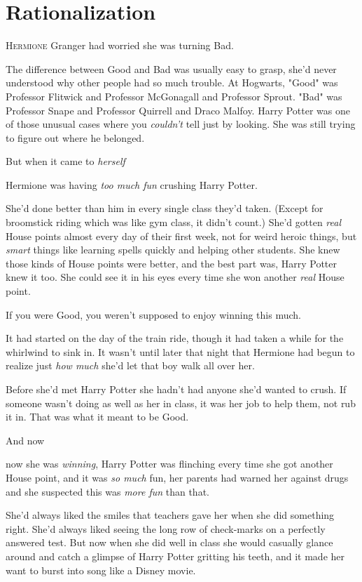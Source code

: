\chapter{Rationalization}

\lettrine{H}{ermione} Granger had worried she was turning Bad.

The difference between Good and Bad was usually easy to grasp, she'd never
understood why other people had so much trouble. At Hogwarts, "Good" was
Professor Flitwick and Professor McGonagall and Professor Sprout. "Bad" was
Professor Snape and Professor Quirrell and Draco Malfoy. Harry Potter{\el}
was one of those unusual cases where you \emph{couldn't} tell just by looking.
She was still trying to figure out where he belonged.

But when it came to \emph{herself}{\el}

Hermione was having \emph{too much fun} crushing Harry Potter.

She'd done better than him in every single class they'd taken. (Except for
broomstick riding which was like gym class, it didn't count.) She'd gotten
\emph{real} House points almost every day of their first week, not for weird
heroic things, but \emph{smart} things like learning spells quickly and helping
other students. She knew those kinds of House points were better, and the best
part was, Harry Potter knew it too. She could see it in his eyes every time she
won another \emph{real} House point.

If you were Good, you weren't supposed to enjoy winning this much.

It had started on the day of the train ride, though it had taken a while for
the whirlwind to sink in. It wasn't until later that night that Hermione had
begun to realize just \emph{how much} she'd let that boy walk all over her.

Before she'd met Harry Potter she hadn't had anyone she'd wanted to crush. If
someone wasn't doing as well as her in class, it was her job to help them, not
rub it in. That was what it meant to be Good.

And now{\el}

{\el} now she was \emph{winning}, Harry Potter was flinching every time she
got another House point, and it was \emph{so much} fun, her parents had warned
her against drugs and she suspected this was \emph{more fun} than that.

She'd always liked the smiles that teachers gave her when she did something
right. She'd always liked seeing the long row of check-marks on a perfectly
answered test. But now when she did well in class she would casually glance
around and catch a glimpse of Harry Potter gritting his teeth, and it made her
want to burst into song like a Disney movie.

